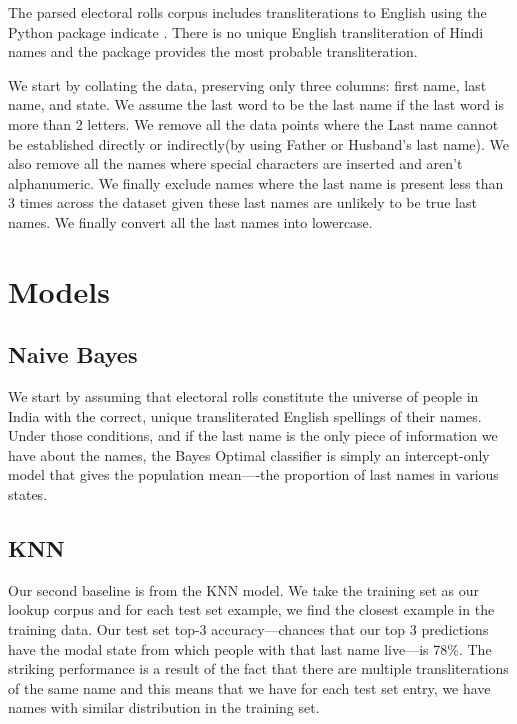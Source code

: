 \documentclass[11pt,  letterpaper]{article}
\begin{document}
The parsed electoral rolls corpus \citep{DVN/MUEGDT_2018} includes transliterations to English using the Python package indicate \citep{Chintalapati_Indicate_Transliterate_Indic_2022}. There is no unique English transliteration of Hindi names and the package provides the most probable transliteration. 

We start by collating the data, preserving only three columns: first name, last name, and state. We assume the last word to be the last name if the last word is more than 2 letters. We remove all the data points where the Last name cannot be established directly or indirectly(by using Father or Husband’s last name). We also remove all the names where special characters are inserted and aren’t alphanumeric. We finally exclude names where the last name is present less than 3 times across the dataset given these last names are unlikely to be true last names. We finally convert all the last names into lowercase. 

\section{Models}

\subsection{Naive Bayes}

We start by assuming that electoral rolls constitute the universe of people in India with the correct, unique transliterated English spellings of their names. Under those conditions, and if the last name is the only piece of information we have about the names, the Bayes Optimal classifier is simply an intercept-only model that gives the population mean—-the proportion of last names in various states. 

\subsection{KNN}

Our second baseline is from the KNN model. We take the training set as our lookup corpus and for each test set example, we find the closest example in the training data. Our test set top-3 accuracy---chances that our top 3 predictions have the modal state from which people with that last name live---is 78\%. The striking performance is a result of the fact that there are multiple transliterations of the same name and this means that we have for each test set entry, we have names with similar distribution in the training set.
\end{document}
